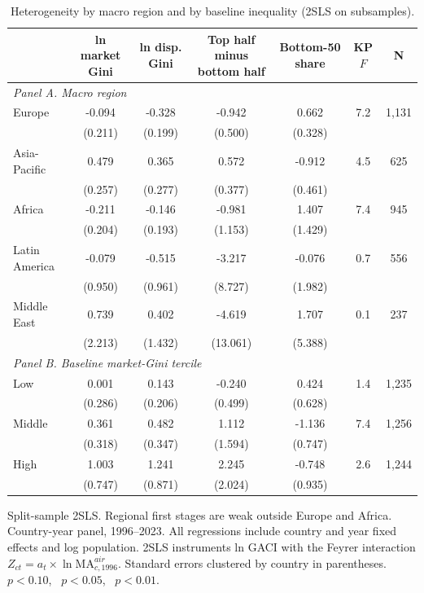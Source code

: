 \begin{table}[H]
\centering
\caption{Heterogeneity by macro region and by baseline inequality (2SLS on subsamples).}
\label{tab:a_regions}
\begin{threeparttable}
\footnotesize
\begin{tabular}{lcccccc}
\toprule
 & ln market Gini & ln disp. Gini & Top half minus bottom half & Bottom-50 share & KP $F$ & N \\
\midrule
\multicolumn{7}{l}{\emph{Panel A. Macro region}}\\
Europe & -0.094 & -0.328\sym{*} & -0.942\sym{*} & 0.662\sym{**} & 7.2 & 1{,}131 \\
 & (0.211) & (0.199) & (0.500) & (0.328) \\
Asia-Pacific & 0.479\sym{*} & 0.365 & 0.572 & -0.912\sym{**} & 4.5 & 625 \\
 & (0.257) & (0.277) & (0.377) & (0.461) \\
Africa & -0.211 & -0.146 & -0.981 & 1.407 & 7.4 & 945 \\
 & (0.204) & (0.193) & (1.153) & (1.429) \\
Latin America & -0.079 & -0.515 & -3.217 & -0.076 & 0.7 & 556 \\
 & (0.950) & (0.961) & (8.727) & (1.982) \\
Middle East & 0.739 & 0.402 & -4.619 & 1.707 & 0.1 & 237 \\
 & (2.213) & (1.432) & (13.061) & (5.388) \\
\multicolumn{7}{l}{\emph{Panel B. Baseline market-Gini tercile}}\\
Low & 0.001 & 0.143 & -0.240 & 0.424 & 1.4 & 1{,}235 \\
 & (0.286) & (0.206) & (0.499) & (0.628) \\
Middle & 0.361 & 0.482 & 1.112 & -1.136 & 7.4 & 1{,}256 \\
 & (0.318) & (0.347) & (1.594) & (0.747) \\
High & 1.003 & 1.241 & 2.245 & -0.748 & 2.6 & 1{,}244 \\
 & (0.747) & (0.871) & (2.024) & (0.935) \\
\bottomrule
\end{tabular}
\begin{tablenotes}\small
\item Split-sample 2SLS. Regional first stages are weak outside Europe and Africa. Country-year panel, 1996--2023. All regressions include country and year fixed effects and log population. 2SLS instruments ln GACI with the Feyrer interaction $Z_{ct}=a_t\times\ln \mathrm{MA}^{air}_{c,1996}$. Standard errors clustered by country in parentheses. \sym{*}~$p<0.10$, \sym{**}~$p<0.05$, \sym{***}~$p<0.01$.
\end{tablenotes}
\end{threeparttable}
\end{table}
